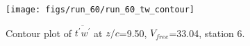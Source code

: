 \begin{figure}[H]
\centering
\texttt{[image: figs/run\_60/run\_60\_tw\_contour]}
\caption{Contour plot of $\overline{t^\prime w^\prime}$ at $z/c$=9.50, $V_{free}$=33.04, station 6.}
\end{figure}



